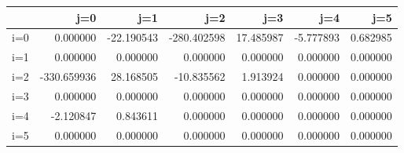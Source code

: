 \begin{tabular}{lrrrrrr}
\toprule
{} &         j=0 &        j=1 &         j=2 &        j=3 &       j=4 &       j=5 \\
\midrule
i=0 &    0.000000 & -22.190543 & -280.402598 &  17.485987 & -5.777893 &  0.682985 \\
i=1 &    0.000000 &   0.000000 &    0.000000 &   0.000000 &  0.000000 &  0.000000 \\
i=2 & -330.659936 &  28.168505 &  -10.835562 &   1.913924 &  0.000000 &  0.000000 \\
i=3 &    0.000000 &   0.000000 &    0.000000 &   0.000000 &  0.000000 &  0.000000 \\
i=4 &   -2.120847 &   0.843611 &    0.000000 &   0.000000 &  0.000000 &  0.000000 \\
i=5 &    0.000000 &   0.000000 &    0.000000 &   0.000000 &  0.000000 &  0.000000 \\
\bottomrule
\end{tabular}
